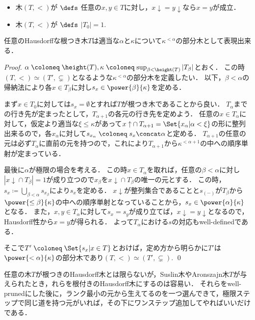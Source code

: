 \documentclass[a4j]{ltjsarticle}
\renewcommand{\defeq}{\mathrel{\coloneq}}
\renewcommand{\emph}[1]{\textsf{\textgt{#1}}}
\begin{document}
\begin{definition}
 \begin{itemize}
  \item 木$(T, <)$が\emph{Hausdorff} $\defs$ 任意の$x, y \in T$に対し，$\mathord{x\downarrow} = \mathord{y \downarrow}$なら$x = y$が成立．
  \item 木$(T, <)$が\emph{根つき木} $\defs$ $|T_0| = 1$.
 \end{itemize}
\end{definition}
\begin{lemma}
 任意のHausdorffな根つき木$T$は適当な$\alpha$と$\kappa$について$\kappa^{<\alpha}$の部分木として表現出来る．
\end{lemma}
\begin{proof}
 $\alpha \defeq \height(T), \kappa \defeq \sup_{\beta < \height(T)} |T_\beta|$とおく．
 この時$(T, <) \simeq (T', \subsetneq)$となるような$\kappa^{<\alpha}$の部分木を定義したい．
 以下，$\beta < \alpha$の帰納法により各$x \in T_\beta$に対し$s_x \in \power{\beta}{\kappa}$を定める．

 まず$x \in T_0$に対しては$s_x = \emptyset$とすれば$T$が根つき木であることから良い．
 $T_\alpha$までの行き先が定まったとして，$T_{\alpha+1}$の各元の行き先を定めよう．
 任意の$x \in T_{\alpha}$に対して，仮定より適当な$\xi \leq \kappa$があって$\mathord{x \uparrow} \cap T_{\alpha+1} = \Set{ x_\alpha | \alpha < \xi}$の形に整列出来るので，各$x_\alpha$に対して$s_{x_\alpha} \defeq s_x \concat \alpha$と定める．
 $T_{\alpha+1}$の任意の元は必ず$T_\alpha$に直前の元を持つので，これにより$T_{\alpha+1}$から$\kappa^{<\alpha+1}$の中への順序単射が定まっている．

 最後に$\alpha$が極限の場合を考える．
 この時$x \in T_\alpha$を取れば，任意の$\beta < \alpha$に対し$|\mathord{x \downarrow} \cap T_\beta| = 1$が成り立つので$x_\beta$を$\mathord{x \downarrow} \cap T_\beta$の唯一の元とする．
 この時，$s_x \defeq \bigcup_{\beta < \alpha} s_{x_\beta}$により$s_x$を定める．
 $x\downarrow$が整列集合であることと$s_{(-)}$が$T_\beta$から$\power{\leq\beta}{\kappa}$の中への順序単射となっていることから，$s_x \in \power{\alpha}{\kappa}$となる．
 また，$x, y \in T_\alpha$に対して$s_x = s_y$が成り立てば，$\mathord{x \downarrow} = \mathord{y \downarrow}$となるので，Hausdorff性から$x = y$が得られる．
 よって$T_\alpha$における$s$の対応もwell-definedである．

 そこで$T' \defeq \Set{ s_x | x \in T}$とおけば，定め方から明らかに$T'$は$\power{<\alpha}{\kappa}$の部分木であり$(T, <) \simeq (T', \subsetneq)$. \qed
\end{proof}

任意の木$T$が根つきのHausdorff木とは限らないが，Suslin木やAronszajn木$T$が与えられたとき，れらを根付きのHausdorff木にするのは容易い．
それらをwell-prunedにした後に，ランク最小の元から生えてるのを一つ選んできて，極限ステップで同じ道を持つ元がいれば，その下にワンステップ追加してやればいいだけである．
\nocite{Shelah:1984,Kunen:1980,Jech:2002}
\nocite{Bekkali:1991bv,Miyazaki:2013fv,Kunen:2011}
\printbibliography[title=参考文献]
\end{document}
